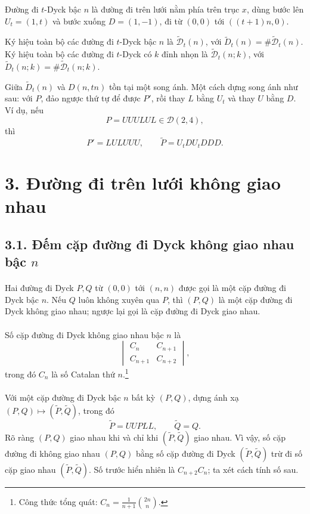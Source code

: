 \documentclass[11pt]{article}
\begin{document}
Đường đi \(t\)-Dyck bậc \(n\) là đường đi trên lưới nằm phía trên trục \(x\),
dùng bước lên \(U_t=(1,t)\) và bước xuống \(D=(1,-1)\), đi từ \((0,0)\) tới
\(((t+1)n,0)\).

Ký hiệu toàn bộ các đường đi \(t\)-Dyck bậc \(n\) là
\(\widetilde{\mathcal D}_t(n)\), với
\(\widetilde D_t(n)=\#\widetilde{\mathcal D}_t(n)\). Ký hiệu toàn bộ các đường
đi \(t\)-Dyck có \(k\) đỉnh nhọn là \(\widetilde{\mathcal D}_t(n;k)\), với
\(\widetilde D_t(n;k)=\#\widetilde{\mathcal D}_t(n;k)\).

Giữa \(\widetilde D_t(n)\) và \(D(n,tn)\) tồn tại một song ánh. Một cách dựng
song ánh như sau: với \(P\), đảo ngược thứ tự để được \(P'\), rồi thay \(L\)
bằng \(U_t\) và thay \(U\) bằng \(D\). Ví dụ, nếu
\[
  P=UUULUL\in\mathcal D(2,4),
\]
thì
\[
  P'=LULUUU,\qquad \widetilde P=U_tDU_tDDD.
\]

\section*{3. Đường đi trên lưới không giao nhau}

\subsection*{3.1. Đếm cặp đường đi Dyck không giao nhau bậc \(n\)}

\paragraph{}
Hai đường đi Dyck \(P,Q\) từ \((0,0)\) tới \((n,n)\) được gọi là một cặp
đường đi Dyck bậc \(n\). Nếu \(Q\) luôn không xuyên qua \(P\), thì \((P,Q)\)
là một cặp đường đi Dyck không giao nhau; ngược lại gọi là cặp đường đi Dyck
giao nhau.

\paragraph{}
Số cặp đường đi Dyck không giao nhau bậc \(n\) là
\[
  \begin{vmatrix}
    C_n & C_{n+1}\\
    C_{n+1} & C_{n+2}
  \end{vmatrix}, \tag{13}
\]
trong đó \(C_n\) là số Catalan thứ \(n\).\footnote{Công thức tổng quát:
\(C_n=\frac1{n+1}\binom{2n}{n}\).}

\paragraph{}
Với một cặp đường đi Dyck bậc \(n\) bất kỳ \((P,Q)\), dựng ánh xạ
\((P,Q)\mapsto(\widetilde P,\widetilde Q)\), trong đó
\[
  \widetilde P=UUPLL,\qquad \widetilde Q=Q.
\]
Rõ ràng \((P,Q)\) giao nhau khi và chỉ khi
\((\widetilde P,\widetilde Q)\) giao nhau. Vì vậy, số cặp đường đi không giao
nhau \((P,Q)\) bằng số cặp đường đi Dyck
\((\widetilde P,\widetilde Q)\) trừ đi số cặp giao nhau
\((\widetilde P,\widetilde Q)\). Số trước hiển nhiên là \(C_{n+2}C_n\); ta xét
cách tính số sau.
\end{document}

